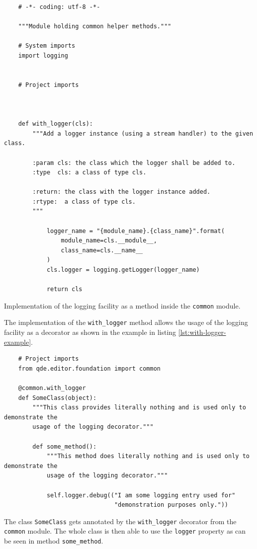 \documentclass[10pt, openright, notitlepage]{scrreprt}
\begin{document}
\begin{listing}[H]
\begin{verbatim}
    # -*- coding: utf-8 -*-
    
    """Module holding common helper methods."""
    
    # System imports
    import logging
    
    
    # Project imports
    
    
    
    def with_logger(cls):
        """Add a logger instance (using a stream handler) to the given class.
    
        :param cls: the class which the logger shall be added to.
        :type  cls: a class of type cls.
    
        :return: the class with the logger instance added.
        :rtype:  a class of type cls.
        """
    
            logger_name = "{module_name}.{class_name}".format(
                module_name=cls.__module__,
                class_name=cls.__name__
            )
            cls.logger = logging.getLogger(logger_name)
            
            return cls
\end{verbatim}
\caption{\label{lst:foundation-common}
Implementation of the logging facility as a method inside the \texttt{common}  module.}
\end{listing}

The implementation of the \texttt{with\_logger} method allows the usage of the
logging facility as a decorator as shown in the example in listing
\ref{lst:with-logger-example}.

\begin{listing}[H]
\begin{verbatim}
    # Project imports
    from qde.editor.foundation import common
    
    @common.with_logger
    def SomeClass(object):
        """This class provides literally nothing and is used only to demonstrate the
        usage of the logging decorator."""
    
        def some_method():
            """This method does literally nothing and is used only to demonstrate the
            usage of the logging decorator."""
    
            self.logger.debug(("I am some logging entry used for"
                               "demonstration purposes only."))
\end{verbatim}
\caption{\label{lst:with-logger-example}
The class \texttt{SomeClass} gets annotated by the \texttt{with\_logger} decorator from the \texttt{common} module. The whole class is then able to use the \texttt{logger} property as can be seen in method \texttt{some\_method}.}
\end{listing}
\end{document}
